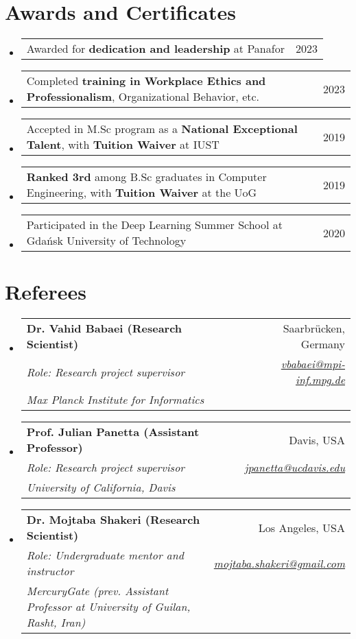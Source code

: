 \documentclass[letterpaper,11pt]{article}
\makeatletter
\newcommand{\resumeSubheading}[5]{
  \item
    \begin{tabular*}{0.97\textwidth}{l@{\extracolsep{\fill}}r}
      \textbf{#1} & #2 \\ 
      \textit{\small#3} & \textit{\small #4} \\
      \textit{#5} & 
    \end{tabular*}\vspace{-5pt}
}
\newcommand{\awarditem}[2]{
  \item
    \begin{tabular*}{0.97\textwidth}{l@{\extracolsep{\fill}}r}
      #1 & #2 \\ 
    \end{tabular*}\vspace{-5pt}
}
\newcommand{\resumeSubHeadingListStart}{\begin{itemize}[leftmargin=*]}
\newcommand{\resumeSubHeadingListEnd}{\end{itemize}}
\newcommand{\awarditemListStart}{\begin{itemize}[leftmargin=*]}
\newcommand{\awarditemListEnd}{\end{itemize}\vspace{-5pt}}
\makeatother
\begin{document}
\section{Awards and Certificates}
\awarditemListStart
  \awarditem{Awarded for \textbf{dedication and leadership} at Panafor}{2023}
  \awarditem{Completed \textbf{training in Workplace Ethics and Professionalism}, Organizational Behavior, etc.}{2023}
  \awarditem{Accepted in M.Sc program as a \textbf{National Exceptional Talent}, with \textbf{Tuition Waiver} at IUST}{2019}
  \awarditem{\textbf{Ranked 3rd} among B.Sc graduates in Computer Engineering, with \textbf{Tuition Waiver} at the UoG}{2019}
  \awarditem{Participated in the Deep Learning Summer School at Gda\'{n}sk University of Technology}{2020}

\awarditemListEnd

\section{Referees}
  \resumeSubHeadingListStart
    \resumeSubheading
      {Dr. Vahid Babaei (Research Scientist)}{Saarbr{\"u}cken, Germany}
       {Role: Research project supervisor}
      {\href{mailto:vbabaei@mpi-inf.mpg.de}{vbabaei@mpi-inf.mpg.de}}{Max Planck Institute for Informatics}

    \resumeSubheading
      {Prof. Julian Panetta (Assistant Professor)}{Davis, USA}
       {Role: Research project supervisor}
      {\href{mailto:jpanetta@ucdavis.edu}{jpanetta@ucdavis.edu}}{University of California, Davis}
    
    \resumeSubheading
      {Dr. Mojtaba Shakeri (Research Scientist)}{Los Angeles, USA}
       {Role: Undergraduate mentor and instructor}
      {\href{mailto:mojtaba.shakeri@gmail.com}{mojtaba.shakeri@gmail.com}}{MercuryGate (prev. Assistant Professor at University of Guilan, Rasht, Iran)}
  \resumeSubHeadingListEnd
\end{document}
